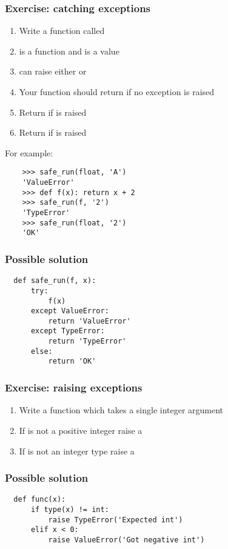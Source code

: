 \documentclass[14pt,compress]{beamer}
\begin{document}
\begin{frame}
  \frametitle{Exercise: catching exceptions}
  \small
  \begin{enumerate}
  \item Write a function called 
  \item {} is a function and  is a value
  \item {} can raise either  or 
  \item Your function should return  if no exception is raised
  \item Return  if  is raised
  \item Return  if  is raised
  \end{enumerate}
  For example:
  \begin{lstlisting}
    >>> safe_run(float, 'A')
    'ValueError'
    >>> def f(x): return x + 2
    >>> safe_run(f, '2')
    'TypeError'
    >>> safe_run(float, '2')
    'OK'
  \end{lstlisting}

\end{frame}

\begin{frame}
\frametitle{Possible solution}
\begin{lstlisting}
  def safe_run(f, x):
      try:
          f(x)
      except ValueError:
          return 'ValueError'
      except TypeError:
          return 'TypeError'
      else:
          return 'OK'

 \end{lstlisting}
\end{frame}

\begin{frame}
  \frametitle{Exercise: raising exceptions}
  \begin{enumerate}
  \item Write a function  which takes a single integer argument 
  \item If  is not a positive integer raise a 
  \item If  is not an integer type raise a 
  \end{enumerate}
\end{frame}

\begin{frame}
  \frametitle{Possible solution}
  \small
\begin{lstlisting}
  def func(x):
      if type(x) != int:
          raise TypeError('Expected int')
      elif x < 0:
          raise ValueError('Got negative int')

\end{lstlisting}
\end{frame}
\end{document}
